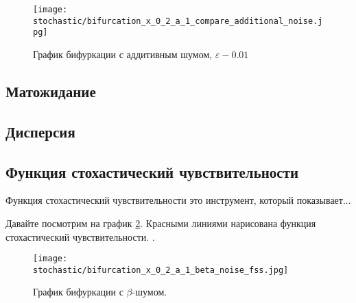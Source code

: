        \begin{figure}
            \centering
            \texttt{[image: stochastic/bifurcation\_x\_0\_2\_a\_1\_compare\_additional\_noise.jpg]}
        
            \captionsetup{justification=centering}
            \caption{График бифуркации с аддитивным шумом, \(\varepsilon - 0.01\)}
            \label{bifurcation_x_0_2_a_1_compare_additional_noise}
        \end{figure}


    \subsection{Матожидание}


    \subsection{Дисперсия}


    \subsection{Функция стохастический чувствительности}
    
        Функция стохастический чувствительности это инструмент, который показывает... 


        Давайте посмотрим на график \ref{bifurcation_x_0_2_a_1_beta_chaos_fss}. Красными линиями нарисована функция стохастический чувствительности. . 

        \begin{figure}
            \centering
            \texttt{[image: stochastic/bifurcation\_x\_0\_2\_a\_1\_beta\_noise\_fss.jpg]}
        
            \captionsetup{justification=centering}
            \caption{График бифуркации с \(\beta\)-шумом.}
            \label{bifurcation_x_0_2_a_1_beta_chaos_fss}
        \end{figure}

